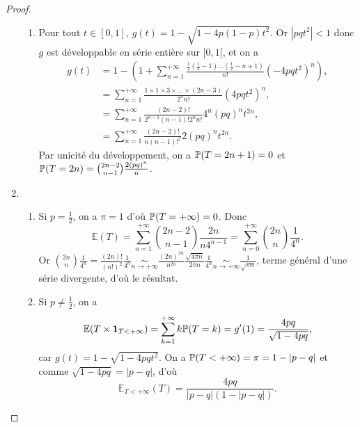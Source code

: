 \documentclass[12pt]{article}
\begin{document}
\begin{proof}
\begin{enumerate}
\begin{enumerate}
            \item Pour tout $t\in[0,1]$, $g(t)=1-\sqrt{1-4p(1-p)t^2}$. Or $\left\lvert pqt^{2}\right\rvert<1$ donc $g$ est développable en série entière sur $[0,1[$, et on a 
            \begin{align}
                g(t)
                &=1-\left(1+\sum_{n=1}^{+\infty}\frac{\frac{1}{2}\left(\frac{1}{2}-1\right)\dots\left(\frac{1}{2}-n+1\right)}{n!}(-4pqt^{2})^{n}\right),\\
                &=\sum_{n=1}^{+\infty}\frac{1\times 1\times 3\times\dots\times(2n-3)}{2^{n}n!}(4pqt^{2})^{n},\\
                &=\sum_{n=1}^{+\infty}\frac{(2n-2)!}{2^{n-1}(n-1)!2^{n}n!}4^{n}(pq)^{n}t^{2n},\\
                &=\sum_{n=1}^{+\infty}\frac{(2n-2)!}{n(n-1)!^{2}}2(pq)^{n}t^{2n}.
            \end{align}
            Par unicité du développement, on a $\P(T=2n+1)=0$ et $\P(T=2n)=\binom{2n-2}{n-1}\frac{2(pq)^{n}}{n}$.
        \end{enumerate}

        \item 
        \begin{enumerate}
            \item Si $p=\frac{1}{2}$, on a $\pi=1$ d'où $\P(T=+\infty)=0$. Donc 
            \begin{equation}
                \mathbb{E}(T)=\sum_{n=1}^{+\infty}\binom{2n-2}{n-1}\frac{2n}{n4^{n-1}}=\sum_{n=0}^{+\infty}\binom{2n}{n}\frac{1}{4^{n}}.
            \end{equation}
            Or $\binom{2n}{n}\frac{1}{4^{n}}=\frac{(2n)!}{(n!)^{2}}\frac{1}{4^{n}}\underset{n\to+\infty}{\sim}\frac{(2n)^{2n}}{n^{2n}}\frac{\sqrt{4\pi n}}{2\pi n}\frac{1}{4^{n}}\underset{n\to+\infty}{\sim}\frac{1}{\sqrt{\pi n}}$, terme général d'une série divergente, d'où le résultat.

            \item Si $p\neq\frac{1}{2}$, on a 
            \begin{equation}
                \mathbb{E}(T\times \mathbf{1}_{T<+\infty})=\sum_{k=1}^{+\infty}k\P(T=k)=g'(1)=\frac{4pq}{\sqrt{1-4pq}},
            \end{equation}
            car $g(t)=1-\sqrt{1-4pqt^{2}}$. On a $\P(T<+\infty)=\pi=1-\left\lvert p-q\right\rvert$ et comme $\sqrt{1-4pq}=\left\lvert p-q\right\rvert$, d'où 
            \begin{equation}
                \mathbb{E}_{T<+\infty}(T)=\frac{4pq}{\left\lvert p-q\right\rvert(1-\left\lvert p-q\right\rvert)}.
            \end{equation}
        \end{enumerate}


\end{enumerate}
\end{proof}
\end{document}
